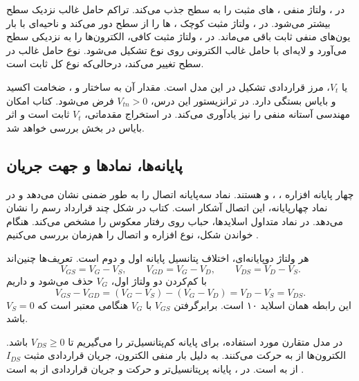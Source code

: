 در ، ولتاژ منفی ، های مثبت را به سطح
جذب می‌کند. تراکم حامل غالب نزدیک سطح بیشتر می‌شود.
در ، ولتاژ مثبت کوچک ، ها را از سطح دور
می‌کند و ناحیه‌ای با بار یون‌های منفی ثابت  باقی می‌ماند.
در ، ولتاژ مثبت کافی، الکترون‌ها را به نزدیکی سطح می‌آورد و
لایه‌ای با حامل غالب الکترونی روی  نوع  تشکیل می‌شود.
نوع حامل غالب در سطح تغییر می‌کند، درحالی‌که نوع  کل  ثابت است.

 یا \(V_t\)، مرز قراردادی تشکیل 
در این مدل است. مقدار آن به ساختار و ، ضخامت اکسید و بایاس بستگی دارد.
در ترانزیستور  این درس، \(V_{tn}>0\) فرض می‌شود.
کتاب امکان مهندسی آستانه منفی را نیز یادآوری می‌کند.
در استخراج مقدماتی، \(V_t\) ثابت است و اثر بایاس  در بخش
 بررسی خواهد شد.

\subsection{پایانه‌ها، نمادها و جهت جریان}
چهار پایانه افزاره ، ،  و  هستند.
نماد سه‌پایانه اتصال  را به طور ضمنی نشان می‌دهد و در نماد چهارپایانه،
این اتصال آشکار است. کتاب در شکل  چند قرارداد رسم را نشان می‌دهد.
در نماد متداول اسلایدها، حباب روی  رفتار معکوس  را مشخص می‌کند.
هنگام خواندن شکل، نوع افزاره و اتصال  را هم‌زمان بررسی می‌کنیم
\cite[صفحه ۶۱]{weste}.

هر ولتاژ دوپایانه‌ای، اختلاف پتانسیل پایانه اول و دوم است. تعریف‌ها چنین‌اند
\begin{equation}
 V_{GS}=V_G-V_S,\qquad V_{GD}=V_G-V_D,\qquad
 V_{DS}=V_D-V_S.
 \label{eq:mos-terminal-voltages}
\end{equation}
با کم‌کردن دو ولتاژ اول، \(V_G\) حذف می‌شود و داریم
\begin{equation*}
 V_{GS}-V_{GD}=(V_G-V_S)-(V_G-V_D)=V_D-V_S=V_{DS}.
\end{equation*}
این رابطه همان اسلاید ۱۰ است. برابرگرفتن \(V_{GS}\) با \(V_G\) هنگامی معتبر است
که \(V_S=0\) باشد.

در مدل متقارن مورد استفاده، برای  پایانه کم‌پتانسیل‌تر را
 می‌گیریم تا \(V_{DS}\ge0\) باشد. الکترون‌ها از  به
 حرکت می‌کنند. به دلیل بار منفی الکترون، جریان قراردادی مثبت
\(I_{DS}\) از  به  است. در ،
 پایانه پرپتانسیل‌تر و حرکت  و جریان قراردادی از
 به  است \cite[صفحه ۶۴]{weste}.


